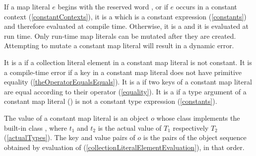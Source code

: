 \documentclass[makeidx]{article}
\begin{document}
{

\LMHash{}%
If a map literal $e$ begins with the reserved word \CONST,
or if $e$ occurs in a constant context
(\ref{constantContexts}),
it is a
which is a constant expression
(\ref{constants})
and therefore evaluated at compile time.
Otherwise, it is a
and it is evaluated at run time.
Only run-time map literals can be mutated after they are created.
Attempting to mutate a constant map literal will result in a dynamic error.


\LMHash{}%
It is a 
if a collection literal element in a constant map literal is not constant.
It is a compile-time error if
a key in a constant map literal
does not have primitive equality
(\ref{theOperatorEqualsEquals}).
It is a
 if two keys of a constant map literal are equal
according to their \lit{==} operator
(\ref{equality}).
It is a  if a type argument of a constant map literal
()
is not a constant type expression
(\ref{constants}).


\LMHash{}%
The value of a constant map literal
is an object $o$ whose class implements the built-in class
,
where $t_1$ and $t_2$ is the actual value of $T_1$ respectively $T_2$
(\ref{actualTypes}).
The key and value pairs of $o$ is
the pairs of the object sequence  obtained by
evaluation of 
(\ref{collectionLiteralElementEvaluation}),
in that order.

}
\end{document}
